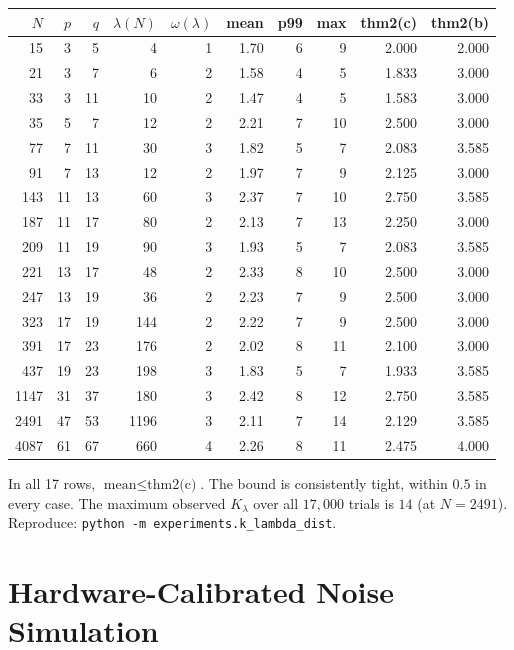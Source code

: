 \documentclass[11pt]{article}
\begin{document}
\begin{center}
\small
\begin{tabular}{rrrrrrrrrr}
\toprule
$N$ & $p$ & $q$ & $\lambda(N)$ & $\omega(\lambda)$ & mean & p99 & max & thm2(c) & thm2(b) \\
\midrule
   15 &  3 &  5 &    4 & 1 & 1.70 &  6 &  9 & 2.000 & 2.000 \\
   21 &  3 &  7 &    6 & 2 & 1.58 &  4 &  5 & 1.833 & 3.000 \\
   33 &  3 & 11 &   10 & 2 & 1.47 &  4 &  5 & 1.583 & 3.000 \\
   35 &  5 &  7 &   12 & 2 & 2.21 &  7 & 10 & 2.500 & 3.000 \\
   77 &  7 & 11 &   30 & 3 & 1.82 &  5 &  7 & 2.083 & 3.585 \\
   91 &  7 & 13 &   12 & 2 & 1.97 &  7 &  9 & 2.125 & 3.000 \\
  143 & 11 & 13 &   60 & 3 & 2.37 &  7 & 10 & 2.750 & 3.585 \\
  187 & 11 & 17 &   80 & 2 & 2.13 &  7 & 13 & 2.250 & 3.000 \\
  209 & 11 & 19 &   90 & 3 & 1.93 &  5 &  7 & 2.083 & 3.585 \\
  221 & 13 & 17 &   48 & 2 & 2.33 &  8 & 10 & 2.500 & 3.000 \\
  247 & 13 & 19 &   36 & 2 & 2.23 &  7 &  9 & 2.500 & 3.000 \\
  323 & 17 & 19 &  144 & 2 & 2.22 &  7 &  9 & 2.500 & 3.000 \\
  391 & 17 & 23 &  176 & 2 & 2.02 &  8 & 11 & 2.100 & 3.000 \\
  437 & 19 & 23 &  198 & 3 & 1.83 &  5 &  7 & 1.933 & 3.585 \\
 1147 & 31 & 37 &  180 & 3 & 2.42 &  8 & 12 & 2.750 & 3.585 \\
 2491 & 47 & 53 & 1196 & 3 & 2.11 &  7 & 14 & 2.129 & 3.585 \\
 4087 & 61 & 67 &  660 & 4 & 2.26 &  8 & 11 & 2.475 & 4.000 \\
\bottomrule
\end{tabular}
\end{center}

\noindent
In all 17 rows, $\text{mean} \leq \text{thm2(c)}$. The bound is consistently tight, within $0.5$ in every case. The maximum observed $K_\lambda$ over all $17{,}000$ trials is $14$ (at $N = 2491$). Reproduce: \texttt{python -m experiments.k\_lambda\_dist}.

\section{Hardware-Calibrated Noise Simulation}
\label{app:hardware}
\end{document}

